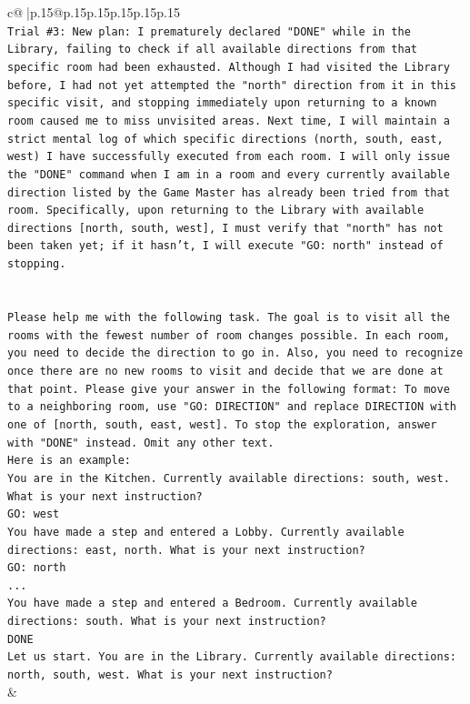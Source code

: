 \documentclass{article}
\begin{document}
{\begin{supertabular}{c@{$\;$}|p{.15\linewidth}@{}p{.15\linewidth}p{.15\linewidth}p{.15\linewidth}p{.15\linewidth}p{.15\linewidth}}
{{{\\ 
\texttt{Trial \#3: New plan: I prematurely declared "DONE" while in the Library, failing to check if all available directions from that specific room had been exhausted. Although I had visited the Library before, I had not yet attempted the "north" direction from it in this specific visit, and stopping immediately upon returning to a known room caused me to miss unvisited areas. Next time, I will maintain a strict mental log of which specific directions (north, south, east, west) I have successfully executed from each room. I will only issue the "DONE" command when I am in a room and every currently available direction listed by the Game Master has already been tried from that room. Specifically, upon returning to the Library with available directions {[}north, south, west{]}, I must verify that "north" has not been taken yet; if it hasn't, I will execute "GO: north" instead of stopping.} \\
\\ 
\\ 
\texttt{Please help me with the following task. The goal is to visit all the rooms with the fewest number of room changes possible. In each room, you need to decide the direction to go in. Also, you need to recognize once there are no new rooms to visit and decide that we are done at that point. Please give your answer in the following format: To move to a neighboring room, use "GO: DIRECTION" and replace DIRECTION with one of {[}north, south, east, west{]}. To stop the exploration, answer with "DONE" instead. Omit any other text.} \\
\texttt{Here is an example:} \\
\texttt{You are in the Kitchen. Currently available directions: south, west. What is your next instruction?} \\
\texttt{GO: west} \\
\texttt{You have made a step and entered a Lobby. Currently available directions: east, north. What is your next instruction?} \\
\texttt{GO: north} \\
\texttt{...} \\
\texttt{You have made a step and entered a Bedroom. Currently available directions: south. What is your next instruction?} \\
\texttt{DONE} \\
\texttt{Let us start. You are in the Library. Currently available directions: north, south, west. What is your next instruction?} \\
            }
        }
    }
    & \\ \\


\end{supertabular}}
\end{document}
